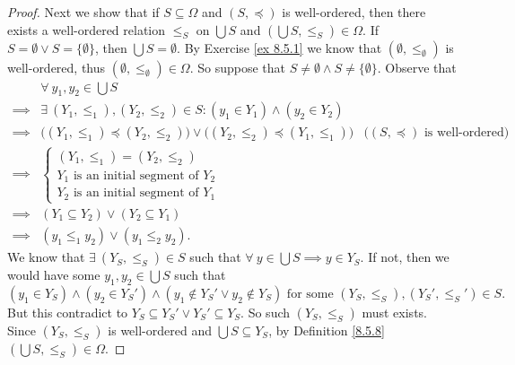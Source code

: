 \begin{proof}
    Next we show that if \(S \subseteq \Omega\) and \((S, \preceq)\) is well-ordered, then there exists a well-ordered relation \(\leq_S\) on \(\bigcup S\) and \((\bigcup S, \leq_S) \in \Omega\).
    If \(S = \emptyset \lor S = \{\emptyset\}\), then \(\bigcup S = \emptyset\).
    By Exercise \ref{ex 8.5.1} we know that \((\emptyset, \leq_{\emptyset})\) is well-ordered, thus \((\emptyset, \leq_{\emptyset}) \in \Omega\).
    So suppose that \(S \neq \emptyset \land S \neq \{\emptyset\}\).
    Observe that
    \begin{align*}
                 & \forall\ y_1, y_2 \in \bigcup S                                                                                                              \\
        \implies & \exists\ (Y_1, \leq_1), (Y_2, \leq_2) \in S : (y_1 \in Y_1) \land (y_2 \in Y_2)                                                              \\
        \implies & \big((Y_1, \leq_1) \preceq (Y_2, \leq_2)\big) \lor \big((Y_2, \leq_2) \preceq (Y_1, \leq_1)\big) & \text{(\((S, \preceq)\) is well-ordered)} \\
        \implies & \begin{cases}
            (Y_1, \leq_1) = (Y_2, \leq_2)             \\
            Y_1 \text{ is an initial segment of } Y_2 \\
            Y_2 \text{ is an initial segment of } Y_1
        \end{cases}                                                                                                                   \\
        \implies & (Y_1 \subseteq Y_2) \lor (Y_2 \subseteq Y_1)                                                                                                 \\
        \implies & (y_1 \leq_1 y_2) \lor (y_1 \leq_2 y_2).
    \end{align*}
    We know that \(\exists\ (Y_S, \leq_S) \in S\) such that \(\forall\ y \in \bigcup S \implies y \in Y_S\).
    If not, then we would have some \(y_1, y_2 \in \bigcup S\) such that
    \[
        (y_1 \in Y_S) \land (y_2 \in Y_S') \land (y_1 \notin Y_S' \lor y_2 \notin Y_S) \text{ for some } (Y_S, \leq_S), (Y_S', \leq_S') \in S.
    \]
    But this contradict to \(Y_S \subseteq Y_S' \lor Y_S' \subseteq Y_S\).
    So such \((Y_S, \leq_S)\) must exists.
    Since \((Y_S, \leq_S)\) is well-ordered and \(\bigcup S \subseteq Y_S\), by Definition \ref{8.5.8} \((\bigcup S, \leq_S) \in \Omega\).


\end{proof}
